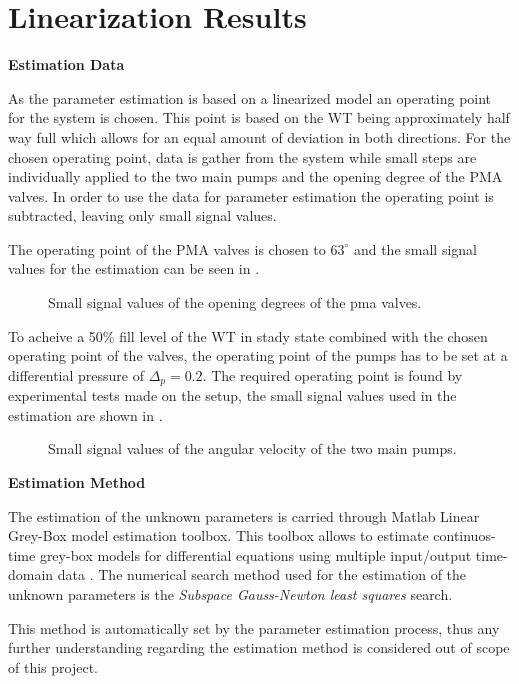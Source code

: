 \chapter{Linearization Results}
\label{LinResults}
\textbf{Estimation Data}

As the parameter estimation is based on a linearized model an operating point for the system is chosen. This point is based on the WT being approximately half way full which allows for an equal amount of deviation in both directions. For the chosen operating point, data is gather from the system while small steps are individually applied to the two main pumps and the opening degree of the PMA valves. In order to use the data for parameter estimation the operating point is subtracted, leaving only small signal values.  

The operating point of the PMA valves is chosen to $63^{\circ}$ and the small signal values for the estimation can be seen in .

\begin{figure}[H]
\centering
 
\caption{Small signal values of the opening degrees of the pma valves. }
\label{fig:est_OD_data}
\end{figure}

To acheive a 50\% fill level of the WT in stady state combined with the chosen operating point of the valves, the operating point of the pumps has to be set at a differential pressure of $\Delta _p = 0.2$. The required operating point is found by experimental tests made on the setup, the small signal values used in the estimation are shown in . 

\begin{figure}[H]
\centering
 
\caption{Small signal values of the angular velocity of the two main pumps.}
\label{fig:est_deltap_data}
\end{figure}

\textbf{Estimation Method}

The estimation of the unknown parameters is carried through Matlab Linear Grey-Box model estimation toolbox. This toolbox allows to estimate continuos-time 
grey-box models for differential equations using multiple input/output time-domain data \cite{LinearEstimation}.
The numerical search method used for the estimation of the unknown parameters is the \textit{Subspace Gauss-Newton least squares} search. 

This method is automatically set by the parameter estimation process, thus any further understanding regarding the estimation method is considered out of 
scope of this project. 


